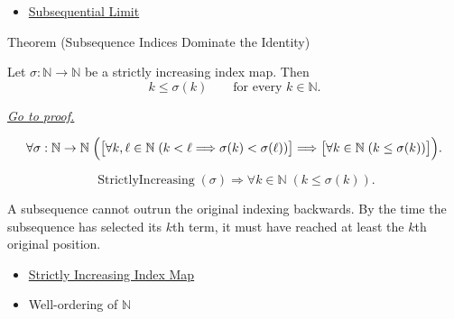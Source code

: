 \begin{dependencies}
\begin{itemize}
  \item \hyperref[def:subsequential-limit]{Subsequential Limit}
\end{itemize}
\end{dependencies}


\begin{theorembox}{Theorem (Subsequence Indices Dominate the Identity)}
\begin{theorem}
\label{thm:subsequence-indices-dominate-identity}
Let $\sigma:\mathbb{N}\to\mathbb{N}$ be a strictly increasing index map.
Then
\[
  k\le \sigma(k)
  \qquad
  \text{for every } k\in\mathbb{N}.
\]

\smallskip
\noindent
\hyperref[prf:subsequence-indices-dominate-identity]{\textit{Go to proof.}}
\end{theorem}
\end{theorembox}

\begin{remark*}
\[
\forall \sigma:\mathbb{N}\to\mathbb{N}\;
\Bigl(
  \bigl[\forall k,\ell\in\mathbb{N}\;(k<\ell\Longrightarrow \sigma(k)<\sigma(\ell))\bigr]
  \Longrightarrow
  \bigl[\forall k\in\mathbb{N}\;(k\le\sigma(k))\bigr]
\Bigr).
\]
\end{remark*}

\begin{remark*}
\[
\operatorname{StrictlyIncreasing}(\sigma)
\Longrightarrow
\forall k\in\mathbb{N}\;(k\le\sigma(k)).
\]
\end{remark*}

\begin{remark*}[Interpretation]
A subsequence cannot outrun the original indexing backwards. By the time the
subsequence has selected its $k$th term, it must have reached at least the
$k$th original position.
\end{remark*}

\begin{dependencies}
\begin{itemize}
  \item \hyperref[def:strictly-increasing-index-map]{Strictly Increasing Index Map}
  \item Well-ordering of $\mathbb{N}$
\end{itemize}
\end{dependencies}

